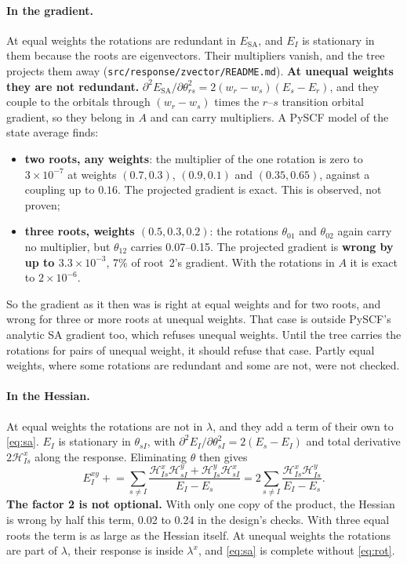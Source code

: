 \documentclass[11pt]{article}
\newcommand{\code}[1]{\texttt{#1}}
\newcommand{\Exy}{E^{xy}}
\begin{document}
\paragraph{In the gradient.} At equal weights the rotations are redundant in
$E_{\mathrm{SA}}$, and $E_I$ is stationary in them because the roots are
eigenvectors. Their multipliers vanish, and the tree projects them away
(\code{src/response/zvector/README.md}). \textbf{At unequal weights
they are not redundant.} $\partial^2E_{\mathrm{SA}}/\partial\theta_{rs}^2 =
2(w_r - w_s)(E_s - E_r)$, and they couple to the orbitals through
$(w_r - w_s)$ times the $r$--$s$ transition orbital gradient, so they
belong in $A$ and can carry multipliers. A PySCF model of the state average
finds:
\begin{itemize}
  \item \textbf{two roots, any weights}: the multiplier of the one rotation
        is zero to $3\times10^{-7}$ at weights $(0.7, 0.3)$, $(0.9, 0.1)$
        and $(0.35, 0.65)$, against a coupling up to $0.16$. The projected
        gradient is exact. This is observed, not proven;
  \item \textbf{three roots, weights $(0.5, 0.3, 0.2)$}: the rotations
        $\theta_{01}$ and $\theta_{02}$ again carry no multiplier, but
        $\theta_{12}$ carries 0.07--0.15. The projected gradient is
        \textbf{wrong by up to $3.3\times10^{-3}$}, 7\% of root~2's
        gradient. With the rotations in $A$ it is exact to $2\times10^{-6}$.
\end{itemize}
So the gradient as it then was is right at equal weights and for two
roots, and wrong for three or more roots at unequal weights. That case is
outside PySCF's analytic SA gradient too, which refuses unequal weights.
Until the tree carries the rotations for pairs of unequal weight, it should
refuse that case. Partly equal weights, where some rotations are redundant
and some are not, were not checked.

\paragraph{In the Hessian.} At equal weights the rotations are not in
$\lambda$, and they add a term of their own to \eqref{eq:sa}. $E_I$ is
stationary in $\theta_{sI}$, with $\partial^2E_I/\partial\theta_{sI}^2 =
2(E_s - E_I)$ and total derivative $2\mathcal H^x_{Is}$ along the response.
Eliminating $\theta$ then gives
\begin{equation}
\boxed{\;
  \Exy_I \mathrel{+}= \sum_{s\neq I}
    \frac{\mathcal H^x_{Is}\mathcal H^y_{sI} + \mathcal H^y_{Is}\mathcal H^x_{sI}}
         {E_I - E_s}
  = 2\sum_{s\neq I}\frac{\mathcal H^x_{Is}\mathcal H^y_{Is}}{E_I - E_s}.\;}
  \label{eq:rot}
\end{equation}
\textbf{The factor 2 is not optional.} With only one copy of the product,
the Hessian is wrong by half this term, 0.02 to 0.24 in the design's
checks. With three equal roots the term is as large as the Hessian itself.
At unequal weights the rotations are part of $\lambda$, their response is
inside $\lambda^x$, and \eqref{eq:sa} is complete without \eqref{eq:rot}.
\end{document}
